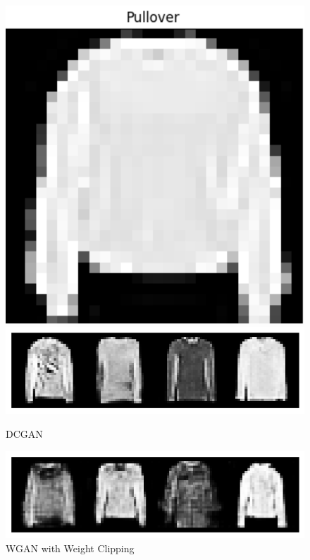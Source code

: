 \documentclass{article}
\begin{document}
\begin{figure}[ht]
{\begin{minipage}[t]{0.45\textwidth}
\begin{minipage}[b]{0.45\textwidth}
            \includegraphics[width=\textwidth]{../src/real_pullover2.png}
        \end{minipage}
        \vfill
    \end{minipage}
    \hfill
    \begin{minipage}[t]{0.45\textwidth}
        \centering
        \includegraphics[width=\textwidth]{../src/dc_pullover.png}
        \caption{DCGAN}
        \label{fig:image1}
        \vspace{0.1cm} %

        \includegraphics[width=\textwidth]{../src/wgan_pullover.png}
        \caption{WGAN with Weight Clipping}
        \label{fig:image2}
        \vspace{0.1cm} %


\end{minipage}}
\end{figure}
\end{document}
